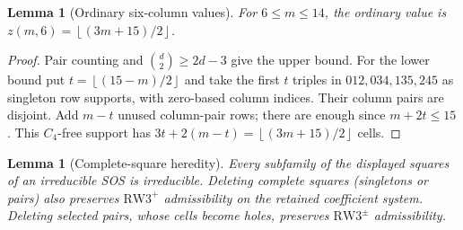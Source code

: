 \documentclass[11pt,a4paper]{article}
\newtheorem{lemma}[theorem]{Lemma}
\theoremstyle{definition}
\newcommand{\RW}{\mathrm{RW3}^{+}}
\newcommand{\SG}{\mathrm{RW3}^{\pm}}
\newcommand{\fl}[1]{\left\lfloor #1\right\rfloor}
\begin{document}
\begin{lemma}[Ordinary six-column values]\label{lem:ordinarysix}
For $6\le m\le14$, the ordinary value is
$z(m,6)=\fl{(3m+15)/2}$.
\end{lemma}
\begin{proof}
Pair counting and $\binom d2\ge2d-3$ give the upper bound.
For the lower bound put $t=\fl{(15-m)/2}$ and take the first $t$
triples in $012,034,135,245$ as singleton row supports, with
zero-based column indices. Their column pairs are disjoint. Add
$m-t$ unused column-pair rows; there are enough since
$m+2t\le15$. This $C_4$-free support has
$3t+2(m-t)=\fl{(3m+15)/2}$ cells.
\end{proof}

\begin{lemma}[Complete-square heredity]\label{lem:heredity}
Every subfamily of the displayed squares of an irreducible SOS is
irreducible. Deleting complete squares (singletons or pairs) also preserves $\RW$
admissibility on the retained coefficient system. Deleting selected pairs,
whose cells become holes, preserves $\SG$ admissibility.
\end{lemma}
\end{document}
